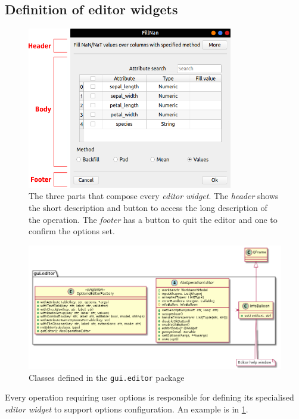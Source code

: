 \subsection{Definition of editor widgets}\label{ssec:define-editor}
\begin{figure}
	\centering
	\includegraphics[width=0.8\textwidth]{editor-sample-sections}
	\caption[The three parts that compose every \textit{editor widget}]{The three parts that compose every \textit{editor widget}. The \textit{header} shows the short description and button to access the long description of the operation. The \textit{footer} has a button to quit the editor and one to confirm the options set.}
	\label{fig:editor-sections}
\end{figure}
\begin{figure}
	\centering
	\includegraphics[width=\textwidth]{../uml/editor_pack}
	\caption{Classes defined in the \texttt{gui.editor} package}
	\label{fig:editor-package}
\end{figure}
Every operation requiring user options is responsible for defining its specialised \textit{editor widget} to support options configuration. An example is in \cref{fig:editor-sections}.\\
